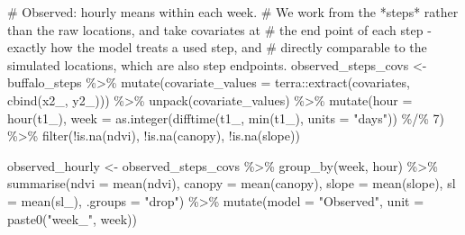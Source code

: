 \documentclass[
  letterpaper,
  DIV=11,
  numbers=noendperiod]{scrartcl}
\newenvironment{Shaded}{\begin{snugshade}}{\end{snugshade}}
\newcommand{\AttributeTok}[1]{\textcolor[rgb]{0.40,0.45,0.13}{#1}}
\newcommand{\CommentTok}[1]{\textcolor[rgb]{0.37,0.37,0.37}{#1}}
\newcommand{\DecValTok}[1]{\textcolor[rgb]{0.68,0.00,0.00}{#1}}
\newcommand{\FunctionTok}[1]{\textcolor[rgb]{0.28,0.35,0.67}{#1}}
\newcommand{\NormalTok}[1]{\textcolor[rgb]{0.00,0.23,0.31}{#1}}
\newcommand{\OtherTok}[1]{\textcolor[rgb]{0.00,0.23,0.31}{#1}}
\newcommand{\SpecialCharTok}[1]{\textcolor[rgb]{0.37,0.37,0.37}{#1}}
\newcommand{\StringTok}[1]{\textcolor[rgb]{0.13,0.47,0.30}{#1}}
\begin{document}
\begin{Shaded}
\begin{Highlighting}[]
\CommentTok{\# Observed: hourly means within each week.}
\CommentTok{\# We work from the *steps* rather than the raw locations, and take covariates at}
\CommentTok{\# the end point of each step {-} exactly how the model treats a used step, and}
\CommentTok{\# directly comparable to the simulated locations, which are also step endpoints.}
\NormalTok{observed\_steps\_covs }\OtherTok{\textless{}{-}}\NormalTok{ buffalo\_steps }\SpecialCharTok{\%\textgreater{}\%}
  \FunctionTok{mutate}\NormalTok{(}\AttributeTok{covariate\_values =}\NormalTok{ terra}\SpecialCharTok{::}\FunctionTok{extract}\NormalTok{(covariates, }\FunctionTok{cbind}\NormalTok{(x2\_, y2\_))) }\SpecialCharTok{\%\textgreater{}\%}
  \FunctionTok{unpack}\NormalTok{(covariate\_values) }\SpecialCharTok{\%\textgreater{}\%}
  \FunctionTok{mutate}\NormalTok{(}\AttributeTok{hour =} \FunctionTok{hour}\NormalTok{(t1\_),}
         \AttributeTok{week =} \FunctionTok{as.integer}\NormalTok{(}\FunctionTok{difftime}\NormalTok{(t1\_, }\FunctionTok{min}\NormalTok{(t1\_), }\AttributeTok{units =} \StringTok{"days"}\NormalTok{)) }\SpecialCharTok{\%/\%} \DecValTok{7}\NormalTok{) }\SpecialCharTok{\%\textgreater{}\%}
  \FunctionTok{filter}\NormalTok{(}\SpecialCharTok{!}\FunctionTok{is.na}\NormalTok{(ndvi), }\SpecialCharTok{!}\FunctionTok{is.na}\NormalTok{(canopy), }\SpecialCharTok{!}\FunctionTok{is.na}\NormalTok{(slope))}

\NormalTok{observed\_hourly }\OtherTok{\textless{}{-}}\NormalTok{ observed\_steps\_covs }\SpecialCharTok{\%\textgreater{}\%}
  \FunctionTok{group\_by}\NormalTok{(week, hour) }\SpecialCharTok{\%\textgreater{}\%}
  \FunctionTok{summarise}\NormalTok{(}\AttributeTok{ndvi   =} \FunctionTok{mean}\NormalTok{(ndvi),}
            \AttributeTok{canopy =} \FunctionTok{mean}\NormalTok{(canopy),}
            \AttributeTok{slope  =} \FunctionTok{mean}\NormalTok{(slope),}
            \AttributeTok{sl     =} \FunctionTok{mean}\NormalTok{(sl\_),}
            \AttributeTok{.groups =} \StringTok{"drop"}\NormalTok{) }\SpecialCharTok{\%\textgreater{}\%}
  \FunctionTok{mutate}\NormalTok{(}\AttributeTok{model =} \StringTok{"Observed"}\NormalTok{, }\AttributeTok{unit =} \FunctionTok{paste0}\NormalTok{(}\StringTok{"week\_"}\NormalTok{, week))}


\end{Highlighting}
\end{Shaded}
\end{document}
